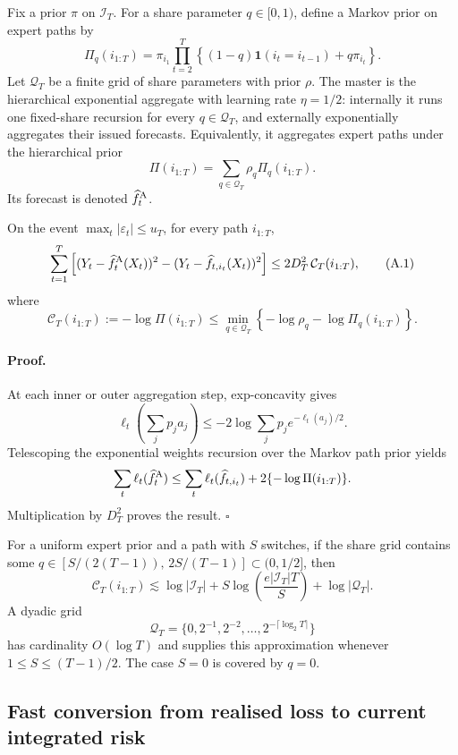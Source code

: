 Fix a prior \(\pi\) on \(\mathcal I_T\).  For a share parameter
\(q\in[0,1)\), define a Markov prior on expert paths by
\[
 \Pi_q(i_{1:T})
 =
 \pi_{i_1}
 \prod_{t=2}^T
 \left\{
 (1-q)\mathbf 1(i_t=i_{t-1})+q\pi_{i_t}
 \right\}.
\]
Let \(\mathcal Q_T\) be a finite grid of share parameters with prior \(\rho\).
The master is the hierarchical exponential aggregate with learning rate
\(\eta=1/2\): internally it runs one fixed-share recursion for every
\(q\in\mathcal Q_T\), and externally exponentially aggregates their issued
forecasts.  Equivalently, it aggregates expert paths under the hierarchical
prior
\[
 \Pi(i_{1:T})=\sum_{q\in\mathcal Q_T}\rho_q\Pi_q(i_{1:T}).
\]
Its forecast is denoted \(\widehat f_t^{\rm A}\).

\begin{lemma}
\label{lem:mixable-path}
On the event \(\max_t|\varepsilon_t|\le u_T\), for every path
\(i_{1:T}\),
\[
 \sum_{t=1}^T
 \left[
 (Y_t-\widehat f_t^{\rm A}(X_t))^2
 -(Y_t-\widehat f_{t,i_t}(X_t))^2
 \right]
 \le
 2D_T^2\,\mathcal C_T(i_{1:T}),
 \tag{A.1}
\]
where
\[
 \mathcal C_T(i_{1:T})
 :=-\log \Pi(i_{1:T})
 \le
 \min_{q\in\mathcal Q_T}
 \left\{
 -\log\rho_q-\log\Pi_q(i_{1:T})
 \right\}.
\]
\end{lemma}

\paragraph{Proof.}
At each inner or outer aggregation step, exp-concavity gives
\[
 \ell_t\!\left(\sum_j p_j a_j\right)
 \le
 -2\log\sum_j p_j e^{-\ell_t(a_j)/2}.
\]
Telescoping the exponential weights recursion over the Markov path prior yields
\[
 \sum_t\ell_t(\widehat f_t^{\rm A})
 \le
 \sum_t\ell_t(\widehat f_{t,i_t})
 +2\{-\log\Pi(i_{1:T})\}.
\]
Multiplication by \(D_T^2\) proves the result. \(\square\)

For a uniform expert prior and a path with \(S\) switches, if the share grid
contains some \(q\in[S/(2(T-1)),\,2S/(T-1)]\subset(0,1/2]\), then
\[
 \mathcal C_T(i_{1:T})
 \lesssim
 \log|\mathcal I_T|
 +S\log\!\left(\frac{e|\mathcal I_T|T}{S}\right)
 +\log|\mathcal Q_T|.
 \tag{A.2}
\]
A dyadic grid
\[
 \mathcal Q_T=\{0,2^{-1},2^{-2},\ldots,2^{-\lceil\log_2T\rceil}\}
\]
has cardinality \(O(\log T)\) and supplies this approximation whenever
\(1\le S\le(T-1)/2\).  The case \(S=0\) is covered by \(q=0\).

\subsection{Fast conversion from realised loss to current integrated risk}


